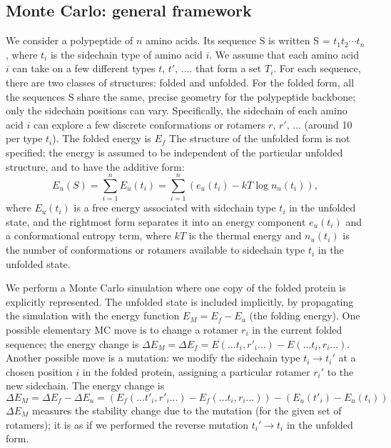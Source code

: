 \subsection{Monte Carlo: general framework}
We consider a polypeptide of $n$ amino acids.
Its sequence S is written  S = $t_1 t_2 \cdots t_n$, where $t_i$ is
the sidechain type of amino acid $i$.
We assume that each amino acid $i$ can take on a few different types $t$,
$t'$, .... that form a set $T_i$.
For each sequence, there are two classes of structures: folded and unfolded.
For the folded form, all the sequences S share the same, precise geometry for the polypeptide backbone; only the
sidechain positions can vary.
Specifically, the sidechain of each amino acid $i$ can explore a few discrete
conformations or rotamers $r$, $r'$, ... (around 10 per type $t_i$). The folded energy is $E_f$
The structure of the unfolded form is not specified; the energy is assumed to be independent of the particular unfolded structure, and to have the additive form:
\begin{equation}  \label{eq:unfolded}
E_u(S) = \sum_{i=1}^n E_u(t_i) = \sum_{i=1}^n \left( e_u(t_i) - kT \log n_u(t_i) \right),
\end{equation}
where $E_u(t_i)$ is a free energy associated with sidechain type $t_i$ in the unfolded state, and the rightmost form
separates it into an energy component $e_u(t_i)$ and a conformational entropy term, where $kT$ is the thermal energy
and $n_u(t_i)$ is the number of conformations or rotamers available to sidechain type $t_i$ in the unfolded state.

We perform a Monte Carlo simulation \cite{Metropolis53,FrenkelBK,GrimmetBK} where one copy of the folded protein
is explicitly represented.
The unfolded state is included implicitly, by propagating the simulation with the energy
function $E_M = E_f - E_u$ (the folding energy).
One possible elementary MC move is to change a rotamer $r_i$ in the
current folded sequence; the energy change is $\Delta E_M = \Delta E_f = E(... t_i,r'_i ...) - E(... t_i,r_i ...)$.
Another possible move is a mutation: we modify the sidechain type $t_i \rightarrow t_i'$ at a chosen position $i$
in the folded protein, assigning a particular rotamer $r_i'$ to the new sidechain.
The energy change is
\begin{equation}  \label{eq:deltaE}
\Delta E_M = \Delta E_f - \Delta E_u =
\left( E_f(... t'_i,r'_i ...) - E_f(... t_i,r_i ...) \right) - \left( E_u(t'_i) - E_u(t_i) \right) 
\end{equation}
$\Delta E_M$ measures the stability change due to the mutation (for the given set of rotamers); it is as if we
performed the reverse mutation $t_i' \rightarrow t_i$ in the unfolded form. 

